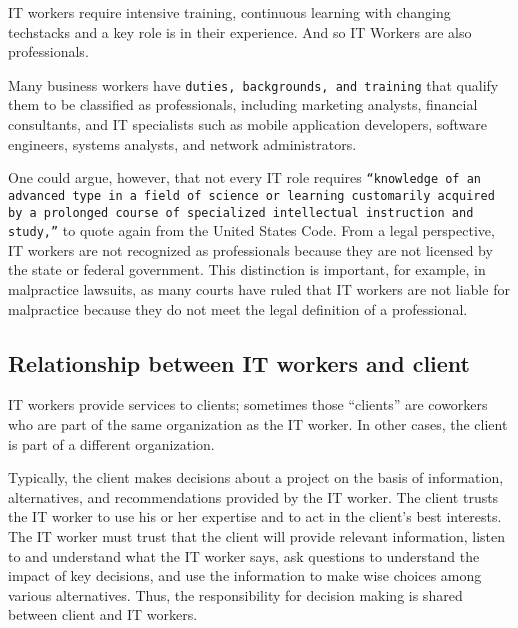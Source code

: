 \documentclass[11pt]{article}
\begin{document}
IT workers require intensive training, continuous learning with changing techstacks and a key role is in their experience. And so IT Workers are also professionals.

Many business workers have \texttt{duties, backgrounds, and training} that qualify them to be classified as professionals, including marketing analysts, financial consultants, and IT specialists such as mobile application developers, software engineers, systems analysts, and network administrators.

One could argue, however, that not every IT role requires \texttt{“knowledge of an advanced type in a field of science or learning customarily acquired by a prolonged course of specialized intellectual instruction and study,”} to quote again from the United States Code. From a legal perspective, IT workers are not recognized as professionals because they are not licensed by the state or federal government. This distinction is important, for example, in malpractice lawsuits, as many courts have ruled that IT workers are not liable for malpractice because they do not meet the legal definition of a professional.
\subsection{Relationship between IT workers and client}
\label{sec:org653c3a4}
IT workers provide services to clients; sometimes those “clients” are coworkers who are part of the same organization as the IT worker. In other cases, the client is part of a different organization.

Typically, the client makes decisions about a project on the basis of information, alternatives, and recommendations provided by the IT worker. The client trusts the IT worker to use his or her expertise and to act in the client’s best interests. The IT worker must trust that the client will provide relevant information, listen to and understand what the IT worker says, ask questions to understand the impact of key decisions, and use the information to make wise choices among various alternatives. Thus, the responsibility for decision making is shared between client and IT workers.
\end{document}
